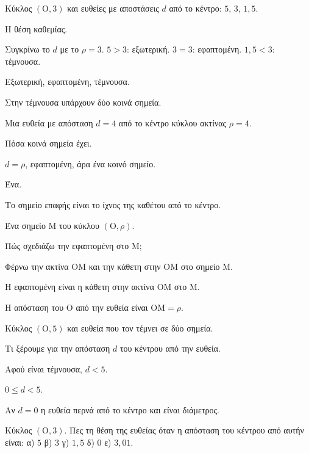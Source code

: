 
\tixero Κύκλος $(\mathrm{Ο},3)$ και ευθείες με αποστάσεις $d$ από το κέντρο: $5$, $3$, $1{,}5$.\par
\tithelo Η θέση καθεμίας.\par
\possindeo Συγκρίνω το $d$ με το $\rho=3$. $5>3$: εξωτερική. $3=3$: εφαπτομένη. $1{,}5<3$: τέμνουσα.\par
\apantisi Εξωτερική, εφαπτομένη, τέμνουσα.\par
\elegxos Στην τέμνουσα υπάρχουν δύο κοινά σημεία.

\tixero Μια ευθεία με απόσταση $d=4$ από το κέντρο κύκλου ακτίνας $\rho=4$.\par
\tithelo Πόσα κοινά σημεία έχει.\par
\possindeo $d=\rho$, εφαπτομένη, άρα ένα κοινό σημείο.\par
\apantisi Ένα.\par
\elegxos Το σημείο επαφής είναι το ίχνος της καθέτου από το κέντρο.

\tixero Ένα σημείο $\mathrm{Μ}$ του κύκλου $(\mathrm{Ο},\rho)$.\par
\tithelo Πώς σχεδιάζω την εφαπτομένη στο $\mathrm{Μ}$;\par
\possindeo Φέρνω την ακτίνα $\mathrm{ΟΜ}$ και την κάθετη στην $\mathrm{ΟΜ}$ στο σημείο $\mathrm{Μ}$.\par
\apantisi Η εφαπτομένη είναι η κάθετη στην ακτίνα $\mathrm{ΟΜ}$ στο $\mathrm{Μ}$.\par
\elegxos Η απόσταση του $\mathrm{Ο}$ από την ευθεία είναι $\mathrm{ΟΜ}=\rho$.

\tixero Κύκλος $(\mathrm{Ο},5)$ και ευθεία που τον τέμνει σε δύο σημεία.\par
\tithelo Τι ξέρουμε για την απόσταση $d$ του κέντρου από την ευθεία.\par
\possindeo Αφού είναι τέμνουσα, $d<5$.\par
\apantisi $0\le d<5$.\par
\elegxos Αν $d=0$ η ευθεία περνά από το κέντρο και είναι διάμετρος.



\ex Κύκλος $(\mathrm{Ο},3)$. Πες τη θέση της ευθείας όταν η απόσταση του κέντρου από αυτήν είναι: α) $5$ \quad β) $3$ \quad γ) $1{,}5$ \quad δ) $0$ \quad ε) $3{,}01$.

